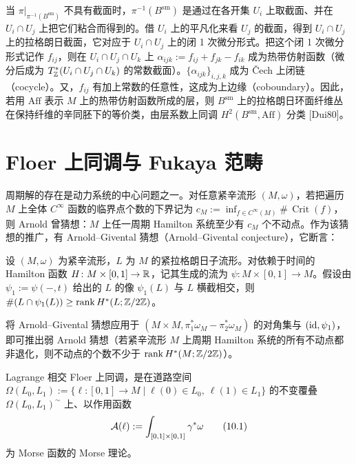 当 $\pi|_{\pi^{-1}(B^{\mathrm{sm}})}$ 不具有截面时，$\pi^{-1}(B^{\mathrm{sm}})$ 是通过在各开集 $U_i$ 上取截面、并在 $U_i\cap U_j$ 上把它们粘合而得到的。借 $U_i$ 上的平凡化来看 $U_j$ 的截面，得到 $U_i\cap U_j$ 上的拉格朗日截面，它对应于 $U_i\cap U_j$ 上的闭 1 次微分形式。把这个闭 1 次微分形式记作 $f_{ij}$，则在 $U_i\cap U_j\cap U_k$ 上 $\alpha_{ijk}:=f_{ij}+f_{jk}-f_{ik}$ 成为热带仿射函数（微分后成为 $T^{*}_{\mathbb{Z}}(U_i\cap U_j\cap U_k)$ 的常数截面）。$\{\alpha_{ijk}\}_{i,j,k}$ 成为 \v{C}ech 上闭链（cocycle）。又，$f_{ij}$ 有加上常数的任意性，这成为上边缘（coboundary）。因此，若用 $\mathrm{Aff}$ 表示 $M$ 上的热带仿射函数所成的层，则 $B^{\mathrm{sm}}$ 上的拉格朗日环面纤维丛在保持纤维的辛同胚下的等价类，由层系数上同调 $H^2(B^{\mathrm{sm}},\mathrm{Aff})$ 分类 [Dui80]。


\section{Floer 上同调与 Fukaya 范畴}

周期解的存在是动力系统的中心问题之一。对任意紧辛流形 $(M,\omega)$，若把遍历 $M$ 上全体 $C^\infty$ 函数的临界点个数的下界记为 $c_M:=\inf_{f\in C^\infty(M)}\#\,\operatorname{Crit}(f)$，则 Arnold 曾猜想：$M$ 上任一周期 Hamilton 系统至少有 $c_M$ 个不动点。作为该猜想的推广，有 Arnold–Givental 猜想（Arnold–Givental conjecture），它断言：

设 $(M,\omega)$ 为紧辛流形，$L$ 为 $M$ 的紧拉格朗日子流形。对依赖于时间的 Hamilton 函数 $H\colon M\times[0,1]\to\mathbb{R}$，记其生成的流为 $\psi\colon M\times[0,1]\to M$。假设由 $\psi_1:=\psi(-,t)$ 给出的 $L$ 的像 $\psi_1(L)$ 与 $L$ 横截相交，则 $\#(L\cap\psi_1(L))\ge\operatorname{rank} H^*(L;\mathbb{Z}/2\mathbb{Z})$。


将 Arnold–Givental 猜想应用于 $(M\times M,\pi_1^*\omega_M-\pi_2^*\omega_M)$ 的对角集与 $(\mathrm{id},\psi_1)$，即可推出弱 Arnold 猜想（若紧辛流形 $M$ 上周期 Hamilton 系统的所有不动点都非退化，则不动点的个数不少于 $\operatorname{rank} H^*(M;\mathbb{Z}/2\mathbb{Z})$）。

Lagrange 相交 Floer 上同调，是在道路空间 $\Omega(L_0,L_1):=\{\ell\colon[0,1]\to M\mid\ell(0)\in L_0,\ \ell(1)\in L_1\}$ 的不变覆叠 $\Omega(L_0,L_1)^{\sim}$ 上、以作用函数
\begin{equation}
    \mathcal{A}(\ell):=\int_{[0,1]\times[0,1]}\gamma^*\omega \tag{10.1}
\end{equation}
为 Morse 函数的 Morse 理论。

